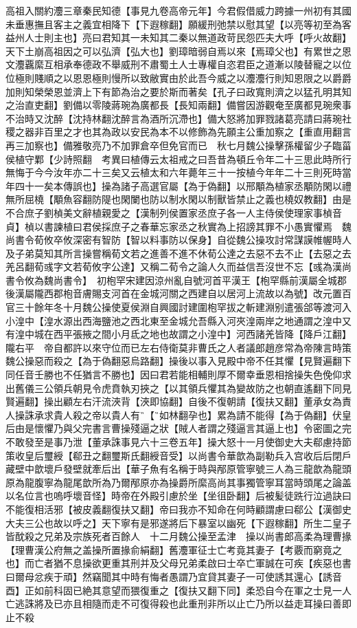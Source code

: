 高祖入關約灋三章秦民知德【事見九卷高帝元年】今君假借威力跨據一州初有其國未垂惠撫且客主之義宜相降下【下遐稼翻】願緩刑弛禁以慰其望【以亮等初至為客益州人士則主也】亮曰君知其一未知其二秦以無道政苛民怨匹夫大呼【呼火故翻】天下土崩高祖因之可以弘濟【弘大也】劉璋暗弱自焉以來【焉璋父也】有累世之恩文灋覊縻互相承奉德政不舉威刑不肅蜀土人士專權自恣君臣之道漸以陵替寵之以位位極則賤順之以恩恩極則慢所以致敝實由於此吾今威之以灋灋行則知恩限之以爵爵加則知榮榮恩並濟上下有節為治之要於斯而著矣【孔子曰政寬則濟之以猛孔明其知之治直吏翻】劉備以零陵蔣琬為廣都長【長知兩翻】備嘗因游觀奄至廣都見琬衆事不治時又沈醉【沈持林翻沈醉言為酒所沉滯也】備大怒將加罪戮諸葛亮請曰蔣琬社稷之器非百里之才也其為政以安民為本不以修飾為先願主公重加察之【重直用翻言再三加察也】備雅敬亮乃不加罪倉卒但免官而已　秋七月魏公操擊孫權留少子臨菑侯植守鄴【少詩照翻　考異曰植傳云太祖戒之曰吾昔為頓丘令年二十三思此時所行無悔于今今汝年亦二十三矣又云植太和六年薨年三十一按植今年年二十三則死時當年四十一矣本傳誤也】操為諸子高選官屬【為于偽翻】以邢顒為植家丞顒防閑以禮無所屈橈【顒魚容翻防隄也閑闌也防以制水閑以制獸皆禁止之義也橈奴教翻】由是不合庶子劉楨美文辭植親愛之【漢制列侯置家丞庶子各一人主侍侯使理家事楨音貞】楨以書諫植曰君侯採庶子之春華忘家丞之秋實為上招謗其罪不小愚實懼焉　魏尚書令荀攸卒攸深密有智防【智以料事防以保身】自從魏公操攻討常謀謨帷幄時人及子弟莫知其所言操嘗稱荀文若之進善不進不休荀公達之去惡不去不止【去惡之去羌呂翻荀彧字文若荀攸字公達】又稱二荀令之論人久而益信吾沒世不忘【彧為漢尚書令攸為魏尚書令】　初枹罕宋建因涼州亂自號河首平漢王【枹罕縣前漢屬全城郡後漢屬隴西郡枹音膚賜支河首在金城河關之西建自以居河上流故以為號】改元置百官三十餘年冬十月魏公操使夏侯淵自興國討建圍枹罕拔之斬建淵别遣張郃等渡河入小湟中【湟水源出西海鹽池之西北東至金城允吾縣入河夾湟兩岸之地通謂之湟中又有湟中城在西平張掖之間小月氐之地也故謂之小湟中】河西諸羌皆降【降戶江翻】隴右平　帝自都許以來守位而已左右侍衛莫非曹氏之人者議郎趙彦常為帝陳言時策魏公操惡而殺之【為于偽翻惡烏路翻】操後以事入見殿中帝不任其懼【見賢遍翻下同任音壬勝也不任猶言不勝也】因曰君若能相輔則厚不爾幸垂恩相捨操失色俛仰求出舊儀三公領兵朝見令虎賁執刃挾之【以其領兵懼其為變故防之也朝直遙翻下同見賢遍翻】操出顧左右汗流浹背【浹即協翻】自後不復朝請【復扶又翻】董承女為責人操誅承求貴人殺之帝以貴人有【如林翻孕也】累為請不能得【為于偽翻】伏皇后由是懷懼乃與父完書言曹操殘逼之狀【賊人者謂之殘逼言其逼上也】令密圖之完不敢發至是事乃泄【董承誅事見六十三卷五年】操大怒十一月使御史大夫郗慮持節策收皇后璽綬【郗丑之翻璽斯氏翻綬音受】以尚書令華歆為副勒兵入宫收后后閉戶藏壁中歆壞戶發壁就牽后出【華子魚有名稱于時與邴原管寧號三人為三龍歆為龍頭原為龍腹寧為龍尾歆所為乃爾邴原亦為操爵所縻高尚其事獨管寧耳當時頭尾之論盖以名位言也嗚呼壞音怪】時帝在外殿引慮於坐【坐徂卧翻】后被髪徒跣行泣過訣曰不能復相活邪【被皮義翻復扶又翻】帝曰我亦不知命在何時顧謂慮曰郗公【漢御史大夫三公也故以呼之】天下寧有是邪遂將后下暴室以幽死【下遐稼翻】所生二皇子皆酖殺之兄弟及宗族死者百餘人　十二月魏公操至孟津　操以尚書郎高柔為理曹掾【理曹漢公府無之盖操所置掾俞絹翻】舊灋軍征士亡考竟其妻子【考覈而窮竟之也】而亡者猶不息操欲更重其刑并及父母兄弟柔啟曰士卒亡軍誠在可疾【疾惡也書曰爾母忿疾于頑】然竊聞其中時有悔者愚謂乃宜貸其妻子一可使誘其還心【誘音酉】正如前科固已絶其意望而猥復重之【復扶又翻下同】柔恐自今在軍之士見一人亡逃誅將及已亦且相隨而走不可復得殺也此重刑非所以止亡乃所以益走耳操曰善即止不殺


